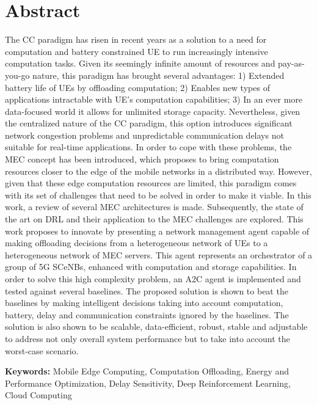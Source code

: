 \section*{Abstract}


\noindent The \acrfull{CC} paradigm has risen in recent years as a solution to a need for computation and battery constrained \acrfull{UE} to run increasingly intensive computation tasks. Given its seemingly infinite amount of resources and pay-as-you-go nature, this paradigm has brought several advantages: 1) Extended battery life of \acrfull{UE}s by offloading computation; 2) Enables new types of applications intractable with \acrfull{UE}'s computation capabilities; 3) In an ever more data-focused world it allows for unlimited storage capacity. Nevertheless, given the centralized nature of the \acrshort{CC} paradigm, this option introduces significant network congestion problems and unpredictable communication delays not suitable for real-time applications. In order to cope with these problems, the \acrfull{MEC} concept has been introduced, which proposes to bring computation resources closer to the edge of the mobile networks in a distributed way. However, given that these edge computation resources are limited, this paradigm comes with its set of challenges that need to be solved in order to make it viable. In this work, a review of several \acrshort{MEC} architectures is made. Subsequently, the state of the art on \acrfull{DRL} and their application to the \acrshort{MEC} challenges are explored. This work proposes to innovate by presenting a network management agent capable of making offloading decisions from a heterogeneous network of \acrshort{UE}s to a heterogeneous network of \acrshort{MEC} servers. This agent represents an orchestrator of a group of 5G \acrfull{SCeNBs}, enhanced with computation and storage capabilities. In order to solve this high complexity problem, an \acrfull{A2C} agent is implemented and tested against several baselines. The proposed solution is shown to beat the baselines by making intelligent decisions taking into
account computation, battery, delay and communication constraints ignored by the baselines. The solution is also shown to be scalable, data-efficient, robust, stable and adjustable to address not only overall system performance but to take into account the worst-case scenario.

\vfill

\textbf{\Large Keywords:} Mobile Edge Computing, Computation Offloading, Energy and Performance Optimization, Delay Sensitivity, Deep Reinforcement Learning, Cloud Computing

